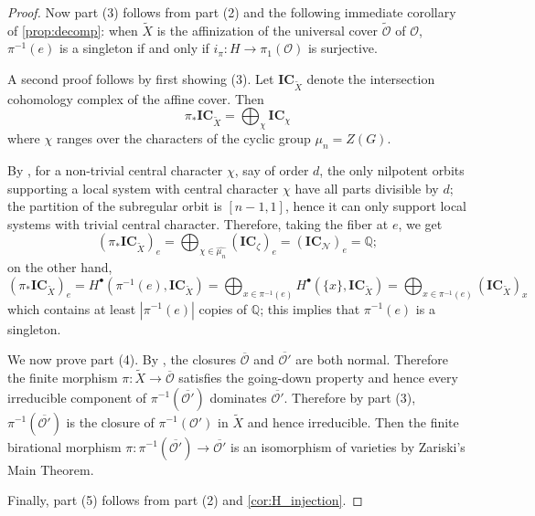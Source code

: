 \documentclass{amsart}
\theoremstyle{definition}
\newcommand{\Q}{\mathbb{Q}}
\newcommand{\cN}{\mathcal{N}}
\newcommand{\0}{\mathcal{O}}
\def\ic{\mathbf{IC}}
\begin{document}
\begin{proof}
	Now part (3) follows from part (2) and the following immediate corollary of \cref{prop:decomp}: when $\widetilde{X}$ is the affinization of the universal cover $\widetilde{\0}$ of $\0$, $\pi^{-1}(e)$ is a singleton if and only if $i_\pi: H \to \pi_1(\0)$ is surjective.

	A second proof follows by first showing (3).   Let $\ic_{\widetilde X}$ denote the intersection cohomology complex of the affine cover.
    Then
    \[
        \pi_* \ic_{\widetilde X} = \bigoplus_{\chi} \ic_\chi
    \]
    where $\chi$ ranges over the characters of the cyclic group $\mu_n = Z(G)$.

    By \cite{Lusztig-Spaltenstein:classical}, for a non-trivial central character $\chi$, say of order $d$, the only nilpotent orbits supporting a local system with central character $\chi$ have all parts divisible by $d$; the partition of the subregular orbit is $[n-1,1]$, hence it can only support local systems with trivial central character. Therefore, taking the fiber at $e$, we get
    \[
    (\pi_* \ic_{\widetilde X})_e
    = \bigoplus_{\chi \in \widehat{\mu_n}}(\ic_\zeta)_e = (\ic_\cN)_e = \Q;
    \]
    on the other hand,
    \[
    (\pi_* \ic_{\widetilde X})_e 
    = H^\bullet(\pi^{-1}(e), \ic_{\widetilde X}) 
    = \bigoplus_{x \in \pi^{-1}(e)} H^\bullet( \{x\}, \ic_{\widetilde X})
    = \bigoplus_{x \in \pi^{-1}(e)} (\ic_{\widetilde X})_{x}
    \]
    which contains at least $|\pi^{-1}(e)|$ copies of $\Q$;
    this implies that $\pi^{-1}(e)$ is a singleton.


	We now prove part (4). By \cite{Kraft-Procesi:typeA_normal}, the closures $\overline{\0}$ and $\overline{\0'}$ are both normal. Therefore the finite morphism $\pi: \widetilde{X} \to \overline{\0}$ satisfies the going-down property and hence every irreducible component of $\pi^{-1}(\overline{\0'})$ dominates $\overline{\0'}$. Therefore by part (3), $\pi^{-1}(\overline{\0'})$ is the closure of $\pi^{-1}(\0')$ in $\widetilde{X}$ and hence irreducible. Then the finite birational morphism $\pi: \pi^{-1}(\overline{\0'}) \to \overline{\0'}$ is an isomorphism of varieties by Zariski's Main Theorem.

	Finally, part (5) follows from part (2) and \cref{cor:H_injection}.
\end{proof}
\end{document}
